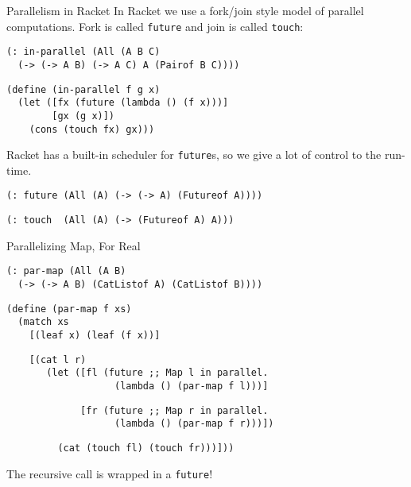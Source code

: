 \documentclass{beamer}
\begin{document}
\begin{frame}[fragile]{Parallelism in Racket}
In Racket we use a fork/join style model of parallel computations. Fork is called \lstinline{future} and join is called \lstinline{touch}:

\begin{lstlisting}
(: in-parallel (All (A B C)
  (-> (-> A B) (-> A C) A (Pairof B C))))
\end{lstlisting}
\pause{}
\begin{lstlisting}
(define (in-parallel f g x)
  (let ([fx (future (lambda () (f x)))]
        [gx (g x)])
    (cons (touch fx) gx)))
\end{lstlisting}

\pause{} \vspace{.5cm}

Racket has a built-in scheduler for \lstinline{future}s, so we give a lot of control to the run-time.

\lstinline{(: future (All (A) (-> (-> A) (Futureof A))))}

\lstinline{(: touch  (All (A) (-> (Futureof A) A)))}
\end{frame}

\begin{frame}[fragile]{Parallelizing Map, For Real}
\begin{lstlisting}
(: par-map (All (A B)
  (-> (-> A B) (CatListof A) (CatListof B))))
\end{lstlisting}
\pause{}
\begin{lstlisting}
(define (par-map f xs)
  (match xs
    [(leaf x) (leaf (f x))]
\end{lstlisting}
\pause{} \vspace{-0.5cm}
\begin{lstlisting}
    [(cat l r)
       (let ([fl (future ;; Map l in parallel.
                   (lambda () (par-map f l)))]
\end{lstlisting}
\pause{} \vspace{-0.5cm}
\begin{lstlisting}
             [fr (future ;; Map r in parallel.
                   (lambda () (par-map f r)))])
\end{lstlisting}
\pause{} \vspace{-0.4cm}
\begin{lstlisting}
         (cat (touch fl) (touch fr)))]))
\end{lstlisting}

The recursive call is wrapped in a \lstinline{future}!
\end{frame}
\end{document}
